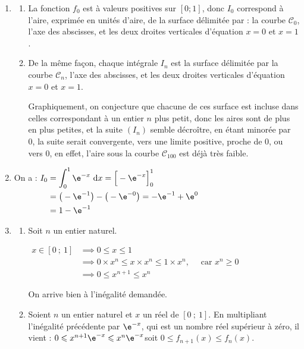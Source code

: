 \begin{enumerate}
	\item \begin{enumerate}
		\item La fonction $f_0$ est à valeurs positives sur $[0 ; 1]$, donc $I_0$ correspond à l'aire, exprimée en unités d'aire, de la surface délimitée par : la courbe $\mathcal{C}_0$, l'axe des abscisses, et les deux droites verticales d'équation $x = 0$ et $x = 1$.

		\item De la même façon, chaque intégrale $I_n$ est la surface délimitée par la courbe $\mathcal{C}_n$, l'axe des abscisses, et les deux droites verticales d'équation $x = 0$ et $x = 1$.

		Graphiquement, on conjecture que chacune de ces surface est incluse dans celles correspondant à un entier $n$ plus petit, donc les aires sont de plus en plus petites, et la suite $(I_n)$ semble décroître, en étant minorée par 0, la suite serait convergente, vers une limite positive, proche de 0, ou vers 0, en effet, l'aire sous la courbe $\mathcal{C}_{100}$ est déjà très faible.
	\end{enumerate}

	\item On a : \quad
	$\displaystyle \begin{aligned}[t]
		I_0
		& = \int_{0}^{1} \e^{-x} ~\mathrm{d}x
		= \Big[-\e^{-x}\Big]_0^1\\
		& = \big(-\e^{-1}\big) - \big(-\e^{-0}\big)
		= -\e^{-1} + \e^{0}\\
		& = 1 - \e^{-1}
	\end{aligned}$

	\item
	\begin{enumerate}
		\item Soit $n$ un entier naturel.

		$\begin{aligned}
			x \in [0~;~1] &\implies 0 \leqslant x \leqslant 1\\
			&\implies 0\times x^n \leqslant x \times x^n \leqslant 1 \times x^n,\quad \text{ car } x^n \geqslant 0\\
			&\implies 0 \leqslant x^{n+1} \leqslant x^n
		\end{aligned}$

		On arrive bien à l'inégalité demandée.

		\item Soient $n$ un entier naturel et $x$ un réel de $[0~;~1]$. En multipliant l'inégalité précédente par $\e^{-x}$, qui est un nombre réel supérieur à zéro, il vient : \quad  $0 \leqslant x^{n+1} \e^{-x} \leqslant x^n \e^{-x}$\quad soit \quad$0 \leqslant f_{n+1}(x) \leqslant f_n(x)$.


\end{enumerate}
\end{enumerate}
